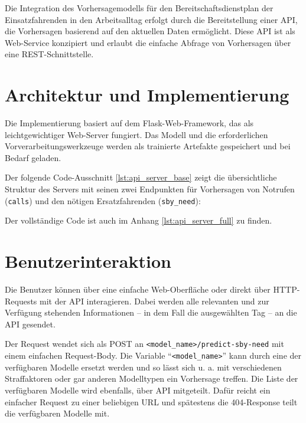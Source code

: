 \documentclass[%
pdftex,
oneside,			%
11pt,				%
parskip=half,		%
headheight = 12pt,	%
headsepline,		%
footsepline,		%
footheight = 16pt,	%
abstracton,		%
DIV=calc,		%
BCOR=8mm,		%
headinclude=false,	%
footinclude=false,	%
listof=totoc,		%
toc=bibliography,	%
]{scrreprt}	%
\begin{document}
    Die Integration des Vorhersagemodells für den Bereitschaftsdienstplan der Einsatzfahrenden in den Arbeitsalltag erfolgt durch die Bereitstellung einer API, die Vorhersagen basierend auf den aktuellen Daten ermöglicht. 
    Diese API ist als Web-Service konzipiert und erlaubt die einfache Abfrage von Vorhersagen über eine REST-Schnittstelle.

    \section{Architektur und Implementierung}

        Die Implementierung basiert auf dem Flask-Web-Framework, das als leichtgewichtiger Web-Server fungiert. 
        Das Modell und die erforderlichen Vorverarbeitungswerkzeuge werden als trainierte Artefakte gespeichert und bei Bedarf geladen. 

        Der folgende Code-Ausschnitt \ref{lst:api_server_base} zeigt die übersichtliche Struktur des Servers mit seinen zwei Endpunkten für Vorhersagen von Notrufen (\texttt{calls}) und den nötigen Ersatzfahrenden (\texttt{sby\_need}):

        \lstset{inputencoding=latin1} %
        

        Der vollständige Code ist auch im Anhang \ref{lst:api_server_full} zu finden. %

    \section{Benutzerinteraktion}

        Die Benutzer können über eine einfache Web-Oberfläche oder direkt über HTTP-Requests mit der API interagieren. 
        Dabei werden alle relevanten und zur Verfügung stehenden Informationen -- in dem Fall die ausgewählten Tag -- an die API gesendet.

        Der Request wendet sich als POST an \texttt{<model\_name>/predict-sby-need} mit einem einfachen Request-Body. 
        Die Variable \enquote{\texttt{<model\_name>}} kann durch eine der verfügbaren Modelle ersetzt werden und so lässt sich u. a. mit verschiedenen Straffaktoren oder gar anderen Modelltypen ein Vorhersage treffen.
        Die Liste der verfügbaren Modelle wird ebenfalls, über API mitgeteilt. 
        Dafür reicht ein einfacher Request zu einer beliebigen URL und spätestens die 404-Response teilt die verfügbaren Modelle mit.
\end{document}
